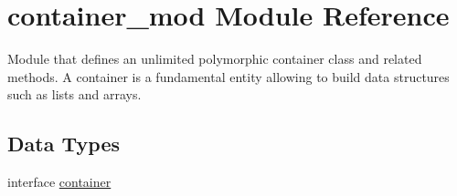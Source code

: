 \hypertarget{namespacecontainer__mod}{}\section{container\+\_\+mod Module Reference}
\label{namespacecontainer__mod}


Module that defines an unlimited polymorphic container class and related methods. A container is a fundamental entity allowing to build data structures such as lists and arrays.  


\subsection*{Data Types}
\begin{DoxyCompactItemize}
\item 
interface \mbox{\hyperlink{structcontainer__mod_1_1container}{container}}
\end{DoxyCompactItemize}
